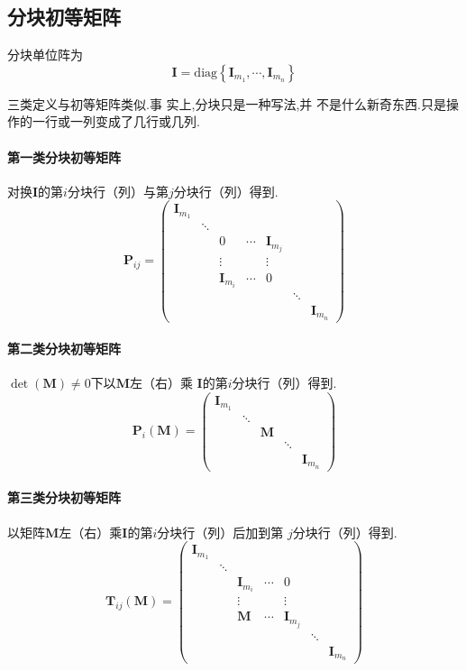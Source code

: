 \subsection{分块初等矩阵}
\begin{formal}
\begin{definition}[分块单位阵]\label{def:分块单位阵}
    分块单位阵为
\[
\bm{I} = \mathrm{diag}\left\{
    \bm{I}_{m_1},\cdots,
    \bm{I}_{m_n}
\right\}
\]
\end{definition}
\end{formal}

\begin{formal}
\begin{definition}[分块初等矩阵]\label{def:分块初等矩阵}
    三类定义与初等矩阵类似.事
    实上,分块只是一种写法,并
    不是什么新奇东西.只是操作的一行或一列变成了几行或几列.
\paragraph{第一类分块初等矩阵}对换$\bm{I}$的第$i$分块行（列）与第$j$分块行（列）得到.
\[
\bm{P}_{ij} = 
\begin{pmatrix}
    \bm{I}_{m_{1}} & & & & & & \\
     & \ddots & & &&&\\
     &&0&\cdots&\bm{I}_{m_j}&&\\
    &&\vdots&&\vdots&&\\
    && \bm{I}_{m_i} & \cdots & 0 &&\\
    &&&&&\ddots&\\
    &&&&&&\bm{I}_{m_n}
\end{pmatrix}
\]
\paragraph{第二类分块初等矩阵}
$ \det\left(\bm{M}\right) \neq 0$下以$\bm{M}$左（右）乘
$\bm{I}$的第$i$分块行（列）得到.
\[
\bm{P}_i\left(\bm{M}\right) = 
\begin{pmatrix}
    \bm{I}_{m_1} & & & & \\
      &\ddots&&&\\
    &&\bm{M}&&\\
    &&&\ddots&\\
    &&&&\bm{I}_{m_n}
\end{pmatrix}
\]
\newpage
\paragraph{第三类分块初等矩阵}
以矩阵$\bm{M}$左（右）乘$\bm{I}$的第$i$分块行（列）后加到第
$j$分块行（列）得到.
\[
\bm{T}_{ij} \left(\bm{M}\right)= 
\begin{pmatrix}
    \bm{I}_{m_1} & & & & & & \\
     & \ddots & & &&&\\
     &&\bm{I}_{m_i}&\cdots&0&&\\
    &&\vdots&&\vdots&&\\
    && \bm{M} & \cdots & \bm{I}_{m_j} &&\\
    &&&&&\ddots&\\
    &&&&&&\bm{I}_{m_n}
\end{pmatrix}
\]
\end{definition}
\end{formal}
